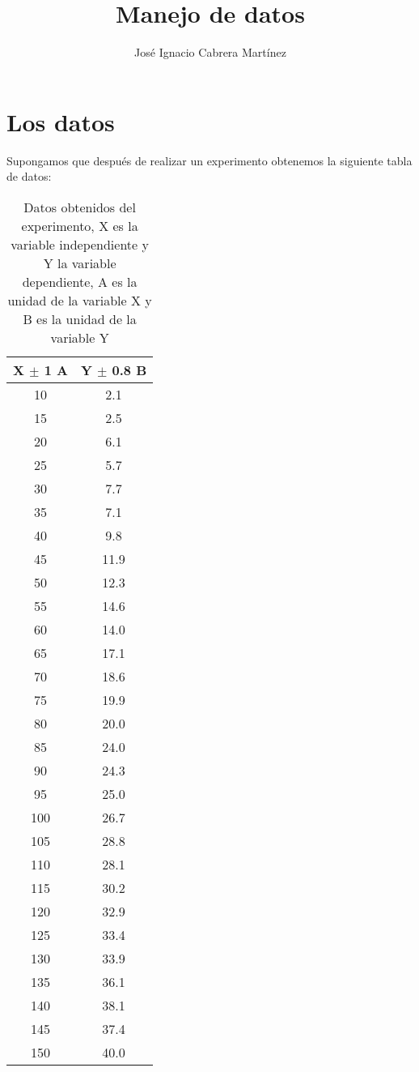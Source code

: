 \documentclass[12pt,letterpaper]{report}
\author{José Ignacio Cabrera Martínez}
\title{Manejo de datos}
\begin{document}
\maketitle
\renewcommand{\tablename}{Tabla}
\section{Los datos}

Supongamos que después de realizar un experimento obtenemos la siguiente tabla de datos:

\begin{table}[h]
  \centering
\begin{tabular}{|c|c|}
\hline 
X $ \pm$ 1 A& Y $\pm $ 0.8 B\\
\hline 
10 & 2.1 \\ 
\hline 
15 & 2.5 \\ 
\hline 
20 & 6.1 \\ 
\hline 
25 & 5.7 \\ 
\hline 
30 & 7.7 \\ 
\hline 
35 & 7.1  \\ 
\hline 
40 & 9.8 \\ 
\hline 
45 & 11.9 \\ 
\hline 
50 & 12.3 \\ 
\hline 
55 & 14.6 \\ 
\hline 
60 & 14.0 \\ 
\hline 
65 & 17.1 \\ 
\hline 
70 & 18.6 \\ 
\hline 
75 & 19.9 \\ 
\hline 
80 & 20.0 \\ 
\hline 
85 & 24.0 \\ 
\hline 
90 & 24.3 \\ 
\hline 
95 & 25.0 \\ 
\hline 
100 & 26.7 \\ 
\hline 
105 & 28.8 \\ 
\hline 
110 & 28.1 \\ 
\hline 
115 & 30.2 \\ 
\hline 
120 & 32.9 \\ 
\hline 
125 & 33.4 \\
\hline 
130 & 33.9 \\
\hline 
135 & 36.1 \\
\hline 
140 & 38.1 \\
\hline 
145 & 37.4 \\
\hline 
150 & 40.0 \\
\hline 

\end{tabular} 
\caption{Datos obtenidos del experimento, X es la variable independiente y Y la variable dependiente, A es la unidad de la variable X y B es la unidad de la variable Y}\label{t1}
\end{table}
\end{document}
